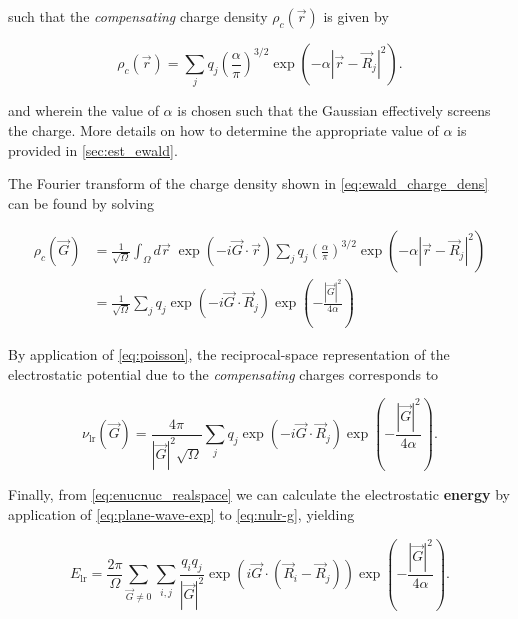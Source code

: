 such that the \textit{compensating} charge density $\rho_{c}(\vec{r})$ is given by

\begin{equation}
    \rho_{c}(\vec{r}) = \sum_{j} q_{j} \left( \frac{\alpha}{\pi} \right)^{3/2} \exp \left(- \alpha \left|\vec{r} - \vec{R}_{j} \right|^{2} \right).
    \label{eq:ewald_charge_dens}
\end{equation}

and wherein the value of $\alpha$ is chosen such that the Gaussian effectively screens the charge. More details on how to determine the appropriate value of $\alpha$ is provided in \cref{sec:est_ewald}.

The Fourier transform of the charge density shown in \cref{eq:ewald_charge_dens} can be found by solving

\begin{align}
    \rho_{c}(\vec{G}) &= \frac{1}{\sqrt{\Omega}}\int_{\Omega} d\vec{r} \; \exp\left(-i\vec{G} \cdot \vec{r} \right) \sum_{j} q_{j} \left( \frac{\alpha}{\pi} \right)^{3/2} \exp \left(- \alpha \left|\vec{r} - \vec{R}_{j} \right|^{2} \right) \\
    &= \frac{1}{\sqrt{\Omega}} \sum_{j} q_{j} \exp \left(-i \vec{G} \cdot \vec{R}_{j} \right) \exp \left(- \frac{|\vec{G}|^{2}}{4 \alpha} \right)
\end{align}

By application of \cref{eq:poisson}, the reciprocal-space representation of the electrostatic potential due to the \textit{compensating} charges corresponds to

\begin{equation}
    \nu_{\text{lr}}(\vec{G}) = \frac{4\pi}{|\vec{G}|^{2}\sqrt{\Omega}} \sum_{j} q_{j} \exp \left(-i \vec{G} \cdot \vec{R}_{j} \right) \exp \left(- \frac{|\vec{G}|^{2}}{4 \alpha} \right).
    \label{eq:nulr-g}
\end{equation}

Finally, from \cref{eq:enucnuc_realspace} we can calculate the electrostatic \textbf{energy} by application of \cref{eq:plane-wave-exp} to \cref{eq:nulr-g}, yielding

\begin{equation}
    E_{\text{lr}} = \frac{2 \pi}{\Omega} \sum_{\vec{G} \neq 0} \sum_{i,j} \frac{q_{i}q_{j}}{|\vec{G}|^{2}} \exp \left(i \vec{G} \cdot \left(\vec{R}_{i} - \vec{R}_{j} \right) \right) \exp \left(- \frac{|\vec{G}|^{2}}{4 \alpha} \right). \label{eq:long-range}
\end{equation}

